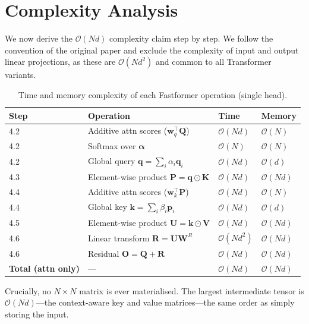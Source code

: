 \documentclass[11pt,a4paper]{article}
\newcommand{\mat}[1]{\mathbf{#1}}
\newcommand{\vect}[1]{\mathbf{#1}}
\newcommand{\odotop}{\odot}
\theoremstyle{definition}
\begin{document}
\section{Complexity Analysis}
\label{sec:complexity}

We now derive the $\mathcal{O}(Nd)$ complexity claim step by step.
We follow the convention of the original paper and exclude the complexity of input and output
linear projections, as these are $\mathcal{O}(Nd^{2})$ and common to all Transformer variants.

\begin{table}[H]
\centering
\caption{Time and memory complexity of each Fastformer operation (single head).}
\label{tab:complexity}
\begin{tabular}{llll}
\toprule
\textbf{Step} & \textbf{Operation} & \textbf{Time} & \textbf{Memory} \\
\midrule
4.2 & Additive attn scores ($\vect{w}_q^{\top}\mat{Q}$)      & $\mathcal{O}(Nd)$   & $\mathcal{O}(N)$  \\
4.2 & Softmax over $\bm{\alpha}$                              & $\mathcal{O}(N)$    & $\mathcal{O}(N)$  \\
4.2 & Global query $\vect{q}=\sum_i\alpha_i\vect{q}_i$       & $\mathcal{O}(Nd)$   & $\mathcal{O}(d)$  \\
4.3 & Element-wise product $\mat{P}=\vect{q}\odotop\mat{K}$  & $\mathcal{O}(Nd)$   & $\mathcal{O}(Nd)$ \\
4.4 & Additive attn scores ($\vect{w}_k^{\top}\mat{P}$)      & $\mathcal{O}(Nd)$   & $\mathcal{O}(N)$  \\
4.4 & Global key $\vect{k}=\sum_i\beta_i\vect{p}_i$          & $\mathcal{O}(Nd)$   & $\mathcal{O}(d)$  \\
4.5 & Element-wise product $\mat{U}=\vect{k}\odotop\mat{V}$  & $\mathcal{O}(Nd)$   & $\mathcal{O}(Nd)$ \\
4.6 & Linear transform $\mat{R}=\mat{U}\mat{W}^{R}$          & $\mathcal{O}(Nd^{2})$ & $\mathcal{O}(Nd)$ \\
4.6 & Residual $\mat{O}=\mat{Q}+\mat{R}$                     & $\mathcal{O}(Nd)$   & $\mathcal{O}(Nd)$ \\
\midrule
\textbf{Total (attn only)} & ---  & $\mathcal{O}(Nd)$ & $\mathcal{O}(Nd)$ \\
\bottomrule
\end{tabular}
\end{table}

\noindent Crucially, no $N\times N$ matrix is ever materialised.
The largest intermediate tensor is $\mathcal{O}(Nd)$---the context-aware key and value
matrices---the same order as simply storing the input.
\end{document}

